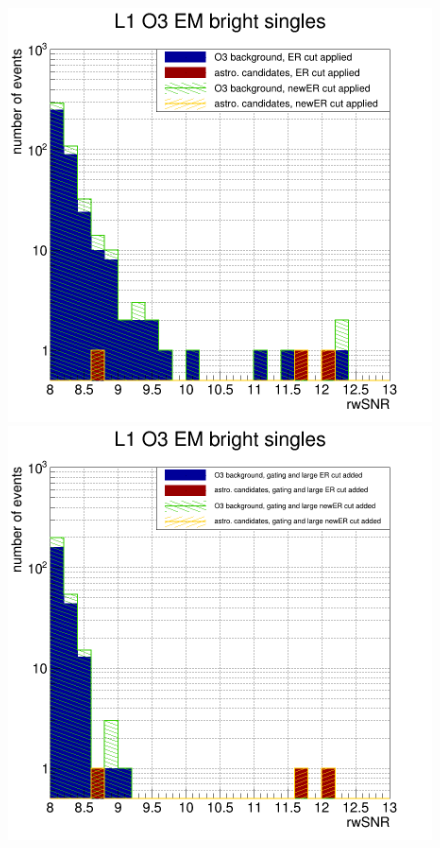 \begin{figure}
  \centering
  \begin{minipage}{0.45\linewidth}
    \centering
    \includegraphics[width=\linewidth]{sectionSelection/plotsNewER/cL1bright_afterCutER_newER.png}
  \end{minipage}
  \hfill
  \begin{minipage}{0.45\linewidth}
    \centering
    \includegraphics[width=\linewidth]{sectionSelection/plotsNewER/cL1bright_afterCutMoreER_newER.png}
  \end{minipage}
  \hfill
  \label{fig:newER_embright}
\end{figure}
